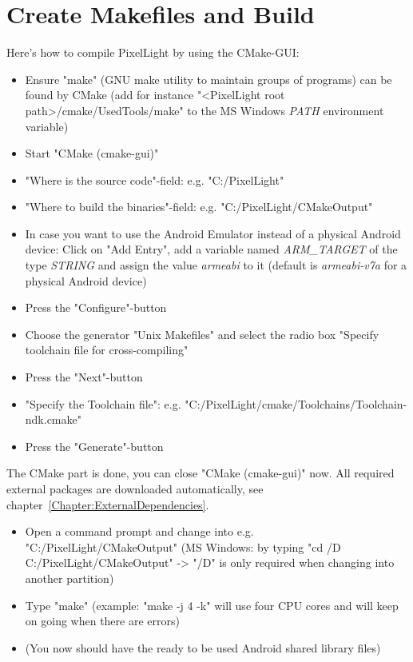 \section{Create Makefiles and Build}
\label{Android:CreateMakefilesAndBuild}
Here's how to compile PixelLight by using the CMake-\ac{GUI}:
\begin{itemize}
\item{Ensure "make" (GNU make utility to maintain groups of programs) can be found by CMake (add for instance "\textless PixelLight root path\textgreater /cmake/UsedTools/make" to the \ac{MS} Windows \emph{PATH} environment variable)}
\item{Start "CMake (cmake-gui)"}
\item{"Where is the source code"-field: e.g. "C:/PixelLight"}
\item{"Where to build the binaries"-field: e.g. "C:/PixelLight/CMakeOutput"}
\item{In case you want to use the Android Emulator instead of a physical Android device: Click on "Add Entry", add a variable named \emph{ARM\_TARGET} of the type \emph{STRING} and assign the value \emph{armeabi} to it (default is \emph{armeabi-v7a} for a physical Android device)}
\item{Press the "Configure"-button}
\item{Choose the generator "Unix Makefiles" and select the radio box "Specify toolchain file for cross-compiling"}
\item{Press the "Next"-button}
\item{"Specify the Toolchain file": e.g. "C:/PixelLight/cmake/Toolchains/Toolchain-ndk.cmake"}
\item{Press the "Generate"-button}
\end{itemize}

The CMake part is done, you can close "CMake (cmake-gui)" now. All required external packages are downloaded automatically, see chapter~\ref{Chapter:ExternalDependencies}.
\begin{itemize}
\item{Open a command prompt and change into e.g. "C:/PixelLight/CMakeOutput" (\ac{MS} Windows: by typing "cd /D C:/PixelLight/CMakeOutput" -> "/D" is only required when changing into another partition)}
\item{Type "make" (example: "make -j 4 -k" will use four \ac{CPU} cores and will keep on going when there are errors)}
\item{(You now should have the ready to be used Android shared library files)}
\end{itemize}




